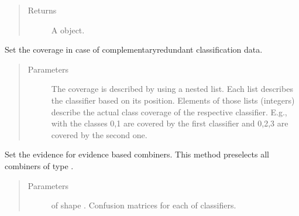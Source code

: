 \documentclass[letterpaper,10pt,english]{sphinxmanual}
\begin{document}
\begin{fulllineitems}
\begin{fulllineitems}
\begin{quote}
\begin{description}
\item[{Returns}] \leavevmode
\sphinxAtStartPar
A  object.

\end{description}\end{quote}

\end{fulllineitems}


\begin{fulllineitems}
\label{\detokenize{pusion.auto.auto_combiner:pusion.auto.auto_combiner.AutoCombiner.set_coverage}}
\sphinxAtStartPar
Set the coverage in case of complementary\sphinxhyphen{}redundant classification data.
\begin{quote}\begin{description}
\item[{Parameters}] \leavevmode
\sphinxAtStartPar
{} \textendash{} The coverage is described by using a nested list. Each list describes the classifier based on
its position. Elements of those lists (integers) describe the actual class coverage of the respective
classifier. E.g., with \sphinxcode{\sphinxupquote{{[}{[}0,1{]}, {[}0,2,3{]}{]}}} the classes 0,1 are covered by the first classifier and
0,2,3 are covered by the second one.

\end{description}\end{quote}

\end{fulllineitems}


\begin{fulllineitems}
\label{\detokenize{pusion.auto.auto_combiner:pusion.auto.auto_combiner.AutoCombiner.set_evidence}}
\sphinxAtStartPar
Set the evidence for evidence based combiners. This method preselects all combiners of type
.
\begin{quote}\begin{description}
\item[{Parameters}] \leavevmode
\sphinxAtStartPar
{} \textendash{}  of shape .
Confusion matrices for each of  classifiers.


\end{description}
\end{quote}
\end{fulllineitems}
\end{fulllineitems}
\end{document}
